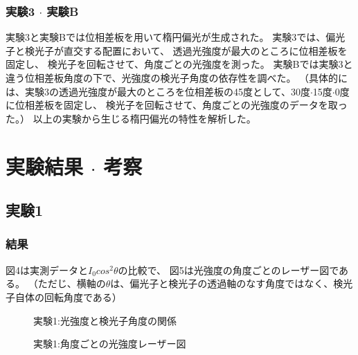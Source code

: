 \documentclass{article}
\begin{document}
\subsubsection{実験3 $\cdot$ 実験B}
\begin{spacing}{1.2}
    \noindent %
    実験3と実験Bでは位相差板を用いて楕円偏光が生成された。
    実験3では、偏光子と検光子が直交する配置において、
    透過光強度が最大のところに位相差板を固定し、
    検光子を回転させて、角度ごとの光強度を測った。
    実験Bでは実験3と違う位相差板角度の下で、光強度の検光子角度の依存性を調べた。
    （具体的には、実験3の透過光強度が最大のところを位相差板の45度として、30度$\cdot$15度$\cdot$0度に位相差板を固定し、
    検光子を回転させて、角度ごとの光強度のデータを取った。）
    以上の実験から生じる楕円偏光の特性を解析した。
\end{spacing}


\section{実験結果 $\cdot$ 考察}
\subsection{実験1}
\subsubsection{結果}
\begin{spacing}{1.2}
    図4は実測データと$I_0cos^2\theta$の比較で、
    図5は光強度の角度ごとのレーザー図である。
    （ただじ、横軸の$\theta$は、偏光子と検光子の透過軸のなす角度ではなく、検光子自体の回転角度である）
\end{spacing}

\begin{figure}[htbp]
    \centering
    \begin{minipage}[b]{0.5\textwidth} %
      \centering
      \caption{実験1:光強度と検光子角度の関係}
      \label{fig:4}
    \end{minipage}%
    \begin{minipage}[b]{0.5\textwidth}
      \centering
      \caption{実験1:角度ごとの光強度レーザー図}
      \label{fig:5}
    \end{minipage}
\end{figure}
\FloatBarrier
\end{document}

